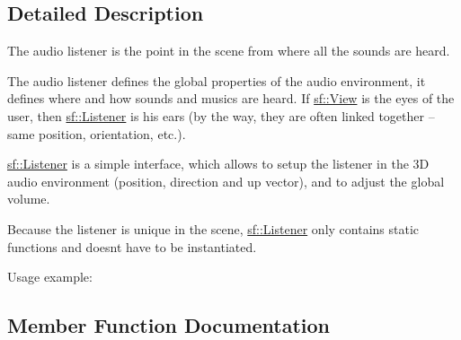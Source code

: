 \subsection{Detailed Description}
The audio listener is the point in the scene from where all the sounds are heard. 

\begin{DoxyVerb}\end{DoxyVerb}


The audio listener defines the global properties of the audio environment, it defines where and how sounds and musics are heard. If \mbox{\hyperlink{classsf_1_1_view}{sf\+::\+View}} is the eyes of the user, then \mbox{\hyperlink{classsf_1_1_listener}{sf\+::\+Listener}} is his ears (by the way, they are often linked together -- same position, orientation, etc.).

\mbox{\hyperlink{classsf_1_1_listener}{sf\+::\+Listener}} is a simple interface, which allows to setup the listener in the 3D audio environment (position, direction and up vector), and to adjust the global volume.

Because the listener is unique in the scene, \mbox{\hyperlink{classsf_1_1_listener}{sf\+::\+Listener}} only contains static functions and doesn\textquotesingle{}t have to be instantiated.

Usage example\+: 
\begin{DoxyCode}{0}
\DoxyCodeLine{\textcolor{comment}{// Move the listener to the position (1, 0, -5)}}
\DoxyCodeLine{}
\DoxyCodeLine{\textcolor{comment}{// Make it face the right axis (1, 0, 0)}}
\DoxyCodeLine{}
\DoxyCodeLine{\textcolor{comment}{// Reduce the global volume}}
\end{DoxyCode}
 \begin{DoxyVerb}\end{DoxyVerb}
 

\subsection{Member Function Documentation}
\mbox{\label{classsf_1_1_listener_a54e91baba51d4431474f53ff7f9309f9}} 
